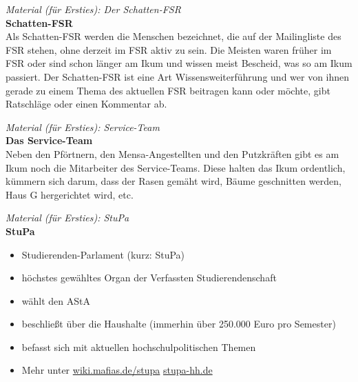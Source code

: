 \documentclass[a4paper,11pt]{scrartcl} %
\begin{document}
\begin{framed}
\textit{Material (für Ersties): Der Schatten-FSR} \\

\textbf{Schatten-FSR}\\ 

Als Schatten-FSR werden die Menschen bezeichnet, 
die auf der Mailingliste des FSR stehen, ohne 
derzeit im FSR aktiv zu sein. Die Meisten waren früher im FSR oder 
sind schon länger am Ikum und wissen meist Bescheid, was so am Ikum 
passiert. Der Schatten-FSR ist eine Art Wissensweiterführung und 
wer von ihnen gerade zu einem Thema des aktuellen FSR beitragen kann
oder möchte, gibt Ratschläge oder einen Kommentar ab.

\end{framed}

\begin{framed}
\textit{Material (für Ersties): Service-Team}\\

\textbf{Das Service-Team} \\

Neben den Pförtnern, den Mensa-Angestellten und den Putzkräften 
gibt es am Ikum noch die Mitarbeiter des Service-Teams. Diese 
halten das Ikum ordentlich, kümmern sich darum, dass der Rasen 
gemäht wird, Bäume geschnitten werden, Haus G hergerichtet wird, etc. 
\end{framed}

\begin{framed}
\textit{Material (für Ersties): StuPa} \\

\textbf{StuPa} \\
\begin{itemize}
\item Studierenden-Parlament (kurz: StuPa) 
\item höchstes gewähltes Organ der Verfassten Studierendenschaft
\item wählt den AStA
\item beschließt über die Haushalte (immerhin über 250.000 Euro pro Semester) 
\item befasst sich mit aktuellen hochschulpolitischen Themen
\item Mehr unter \url{wiki.mafias.de/stupa} \url{stupa-hh.de} 
\end{itemize}
\end{framed}
\end{document}
